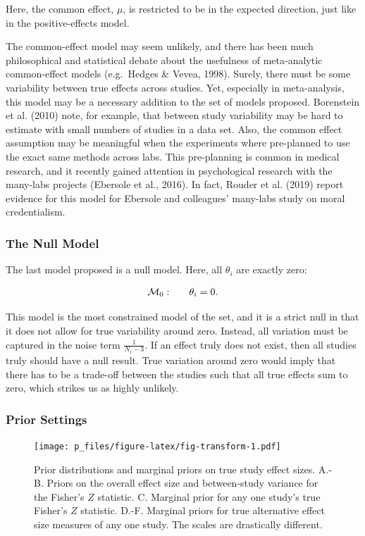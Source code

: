 \documentclass[english,,man]{apa6}
\begin{document}
Here, the common effect, \(\mu\), is restricted to be in the expected direction, just like in the positive-effects model.

The common-effect model may seem unlikely, and there has been much philosophical and statistical debate about the usefulness of meta-analytic common-effect models (e.g.~Hedges \& Vevea, 1998). Surely, there must be some variability between true effects across studies. Yet, especially in meta-analysis, this model may be a necessary addition to the set of models proposed. Borenstein et al. (2010) note, for example, that between study variability may be hard to estimate with small numbers of studies in a data set. Also, the common effect assumption may be meaningful when the experiments where pre-planned to use the exact same methods across labs. This pre-planning is common in medical research, and it recently gained attention in psychological research with the many-labs projects (Ebersole et al., 2016). In fact, Rouder et al. (2019) report evidence for this model for Ebersole and colleagues' many-labs study on moral credentialism.

\hypertarget{the-null-model}{%
\subsubsection{The Null Model}\label{the-null-model}}

The last model proposed is a null model. Here, all \(\theta_i\) are exactly zero:

\[
  \begin{array}{llr}
{\cal M}_0: && \theta_i = 0.\\
\end{array}
\]

This model is the most constrained model of the set, and it is a strict null in that it does not allow for true variability around zero. Instead, all variation must be captured in the noise term \(\frac{1}{N_i - 3}\). If an effect truly does not exist, then all studies truly should have a null result. True variation around zero would imply that there has to be a trade-off between the studies such that all true effects sum to zero, which strikes us as highly unlikely.

\hypertarget{prior-settings}{%
\subsubsection{Prior Settings}\label{prior-settings}}

\begin{figure}
\centering
\texttt{[image: p\_files/figure-latex/fig-transform-1.pdf]}
\caption{\label{fig:fig-transform}Prior distributions and marginal priors on true study effect sizes. A.-B. Priors on the overall effect size and between-study variance for the Fisher's \(Z\) statistic. C. Marginal prior for any one study's true Fisher's \(Z\) statistic. D.-F. Marginal priors for true alternative effect size measures of any one study. The scales are drastically different.}
\end{figure}
\end{document}
